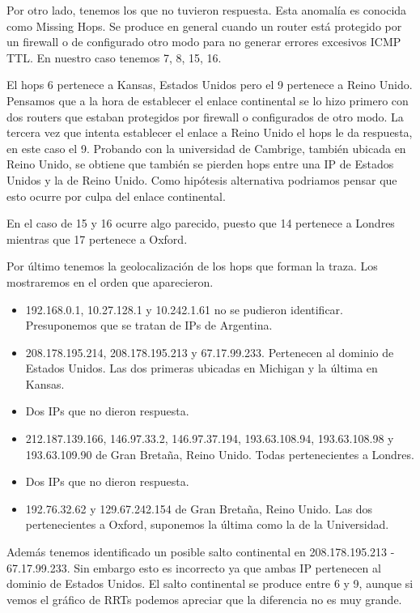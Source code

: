 Por otro lado, tenemos los que no tuvieron respuesta. Esta anomalía es conocida como Missing Hops.
Se produce en general cuando un router está protegido por un firewall o de configurado otro modo para no
generar errores excesivos ICMP TTL. En nuestro caso tenemos 7, 8, 15, 16.

El hops 6 pertenece a Kansas, Estados Unidos pero el 9 pertenece a Reino Unido. Pensamos que a la hora de
establecer el enlace continental se lo hizo primero con dos routers que estaban protegidos por firewall o
configurados de otro modo. La tercera vez que intenta establecer el enlace a Reino Unido el hops le da
respuesta, en este caso el 9. Probando con la universidad de Cambrige, también ubicada en Reino Unido, se
obtiene que también se pierden hops entre una IP de Estados Unidos y la de Reino Unido. Como hipótesis
alternativa podriamos pensar que esto ocurre por culpa del enlace continental.%

En el caso de 15 y 16 ocurre algo parecido, puesto que 14 pertenece a Londres mientras que 17 pertenece a
Oxford.

Por último tenemos la geolocalización de los hops que forman la traza. Los mostraremos en el orden que
aparecieron.

\begin{itemize}
\item 192.168.0.1, 10.27.128.1 y 10.242.1.61 no se pudieron identificar. Presuponemos que se tratan de IPs
de Argentina.
\item 208.178.195.214, 208.178.195.213 y 67.17.99.233. Pertenecen al dominio de Estados Unidos. Las dos
primeras ubicadas en Michigan y la última en Kansas.
\item Dos IPs que no dieron respuesta.
\item 212.187.139.166, 146.97.33.2, 146.97.37.194, 193.63.108.94, 193.63.108.98 y 193.63.109.90 de
Gran Bretaña, Reino Unido. Todas pertenecientes a Londres.
\item Dos IPs que no dieron respuesta.
\item 192.76.32.62 y 129.67.242.154 de Gran Bretaña, Reino Unido. Las dos pertenecientes a Oxford, suponemos
la última como la de la Universidad.
\end{itemize}

Además tenemos identificado un posible salto continental en 208.178.195.213 - 67.17.99.233. Sin embargo esto
es incorrecto ya que ambas IP pertenecen al dominio de Estados Unidos. El salto continental se produce entre
6 y 9, aunque si vemos el gráfico de RRTs podemos apreciar que la diferencia no es muy grande.

